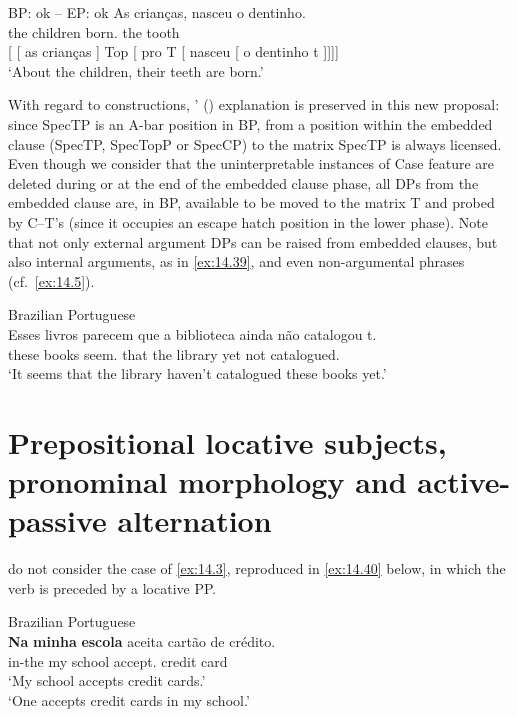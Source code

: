\documentclass[output=paper]{langsci/langscibook}
\begin{document}
\ea%
    \label{ex:14.38} \gls{BP}: ok -- \gls{EP}: ok
    \ea
    \gll    As crianças, nasceu o dentinho.\\
            the children born.\Tsg{} the tooth\\
    \glt
    \ex     {}[ [ as crianças ] Top [ pro\tss{\Expl} T [ nasceu [ o dentinho t ]]]]\\
            ‘About the children, their teeth are born.’
    \z
\z

With regard to  constructions,
\citeauthor{AvelarGalves2011}' (\citeyear{AvelarGalves2011,AvelarGalves2016})
explanation is preserved in this new proposal: since SpecTP is an A-bar
position in BP,  from a position within the embedded clause (SpecTP,
SpecTopP or SpecCP) to the matrix SpecTP is always licensed. Even though we
consider that the uninterpretable instances of Case feature are deleted during
or at the end of the embedded clause phase, all DPs from the embedded clause
are, in BP, available to be moved to the matrix T and probed by C--T’s
 (since it occupies an escape hatch position in the lower
phase).  Note that not only external argument DPs can be raised from embedded
clauses, but also internal arguments, as in \eqref{ex:14.39}, and even
non-argumental phrases (cf.\ \eqref{ex:14.5}).

\ea\label{ex:14.39}Brazilian Portuguese\\
    \gll    Esses  livros parecem que a biblioteca ainda não catalogou t.\\
            these books seem.\Tpl{} that   the library yet not catalogued.\Tsg{}\\
    \glt    ‘It seems that the library haven’t catalogued these books yet.’
\z

\section{Prepositional locative subjects, pronominal morphology and
active-passive alternation}\label{sec:14.6}\largerpage[2]

\textcite{AvelarGalves2011,AvelarGalves2016} do not consider the case of
\eqref{ex:14.3}, reproduced in \eqref{ex:14.40} below, in which the verb
is preceded by a locative PP.

\ea%
    \label{ex:14.40}Brazilian Portuguese\\
    \gll    \textbf{Na} \textbf{minha} \textbf{escola} aceita {cartão de crédito}.\\
            in-the my school accept.\Tsg{} {credit card}\\
    \glt    ‘My school accepts credit cards.’\\
            ‘One accepts credit cards in my school.’
\z
\end{document}
